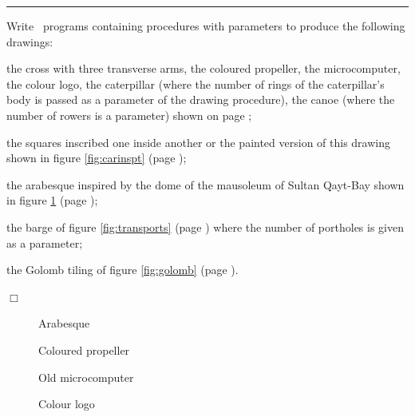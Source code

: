\noindent \rule{137mm}{0.1mm}\par\nopagebreak %
\begin{exercices}{Write \python\ programs containing procedures with
parameters to produce the following drawings:

\tiret the cross with three transverse arms, the coloured propeller, the mi\-cro\-com\-put\-er,
the colour logo, the caterpillar (where the number
of rings of the caterpillar's body is passed as a parameter of the drawing procedure), the canoe 
(where the number of rowers is a parameter) shown on page \pageref{fig:crx3b};

\tiret the squares inscribed one inside another
or the painted version of this drawing shown in figure \ref{fig:carinspt} (page \pageref{fig:carinspt});

\tiret the arabesque inspired by the dome of the mausoleum of Sultan
         Qayt-\-Bay shown in figure \ref{fig:arab2} (page \pageref{fig:arab2});

\tiret the barge of figure \ref{fig:transports} (page \pageref{fig:transports}) where the number
         of portholes is given as a parameter;

\tiret the Golomb tiling of figure \ref{fig:golomb} (page \pageref{fig:golomb}).

\noindent $\Box$}\end{exercices}
\twocolumn
\begin{figure}[h]
 \caption{Arabesque}\label{fig:arab2}
\end{figure}
\vfill
\begin{figure}[h]
 \caption{Coloured propeller}
\end{figure}
\vfill
\begin{figure}[h]
 \caption{Old microcomputer}
\end{figure}
\mbox{}
\newpage
\begin{figure}[!h]
%
\caption{Colour logo}%
\end{figure}

